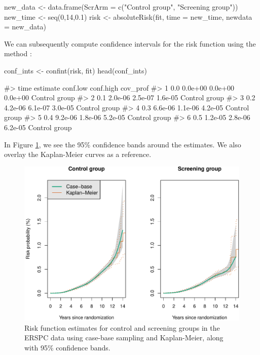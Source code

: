 \begin{Schunk}
\begin{Sinput}
new_data <- data.frame(ScrArm = c("Control group", "Screening group"))
new_time <- seq(0,14,0.1)
risk <- absoluteRisk(fit, time = new_time, newdata = new_data)
\end{Sinput}
\end{Schunk}

We can subsequently compute confidence intervals for the risk function
using the method :

\begin{Schunk}
\begin{Sinput}
conf_ints <- confint(risk, fit)
head(conf_ints)
\end{Sinput}
\begin{Soutput}
#>   time estimate conf.low conf.high      cov_prof
#> 1  0.0  0.0e+00  0.0e+00   0.0e+00 Control group
#> 2  0.1  2.0e-06  2.5e-07   1.6e-05 Control group
#> 3  0.2  4.2e-06  6.1e-07   3.0e-05 Control group
#> 4  0.3  6.6e-06  1.1e-06   4.2e-05 Control group
#> 5  0.4  9.2e-06  1.8e-06   5.2e-05 Control group
#> 6  0.5  1.2e-05  2.8e-06   6.2e-05 Control group
\end{Soutput}
\end{Schunk}

In Figure \ref{fig:erspc-cif-conf}, we see the 95\% confidence bands
around the estimates. We also overlay the Kaplan-Meier curves as a
reference.

\begin{Schunk}
\begin{figure}[ht]
\includegraphics[width=\textwidth,keepaspectratio=true]{./erspc-cif-conf-1} \caption[Risk function estimates for control and screening groups in the ERSPC data using case-base sampling and Kaplan-Meier, along with 95\% confidence bands]{Risk function estimates for control and screening groups in the ERSPC data using case-base sampling and Kaplan-Meier, along with 95\% confidence bands.}\label{fig:erspc-cif-conf}
\end{figure}
\end{Schunk}

